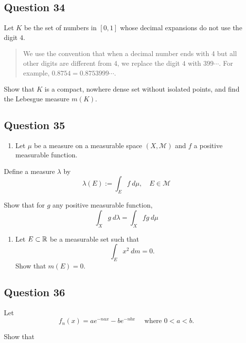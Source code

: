 \documentclass[12pt]{article}
\providecommand{\tightlist}{%
  \setlength{\itemsep}{0pt}\setlength{\parskip}{0pt}}
\begin{document}
\hypertarget{question-34-1}{%
\subsection{Question 34}\label{question-34-1}}

Let \(K\) be the set of numbers in \([0, 1]\) whose decimal expansions
do not use the digit \(4\).

\begin{quote}
We use the convention that when a decimal number ends with 4 but all
other digits are different from 4, we replace the digit \(4\) with
\(399\cdots\). For example, \(0.8754 = 0.8753999\cdots\).
\end{quote}

Show that \(K\) is a compact, nowhere dense set without isolated points,
and find the Lebesgue measure \(m(K)\).

\hypertarget{question-35-1}{%
\subsection{Question 35}\label{question-35-1}}

\begin{enumerate}
\def\labelenumi{\alph{enumi}.}
\tightlist
\item
  Let \(\mu\) be a measure on a measurable space \((X, \mathcal M)\) and
  \(f\) a positive measurable function.
\end{enumerate}

Define a measure \(\lambda\) by \[
\lambda(E):=\int_{E} f ~d \mu, \quad E \in \mathcal{M}
\]

Show that for \(g\) any positive measurable function, \[
\int_{X} g ~d \lambda=\int_{X} f g ~d \mu
\]

\begin{enumerate}
\def\labelenumi{\alph{enumi}.}
\setcounter{enumi}{1}
\tightlist
\item
  Let \(E \subset {\mathbb{R}}\) be a measurable set such that \[
  \int_{E} x^{2} ~d m=0.
  \] Show that \(m(E) = 0\).
\end{enumerate}

\hypertarget{question-36-1}{%
\subsection{Question 36}\label{question-36-1}}

Let \[
f_{n}(x)=a e^{-n a x}-b e^{-n b x} \quad \text{ where } 0 < a < b.
\]

Show that
\end{document}
